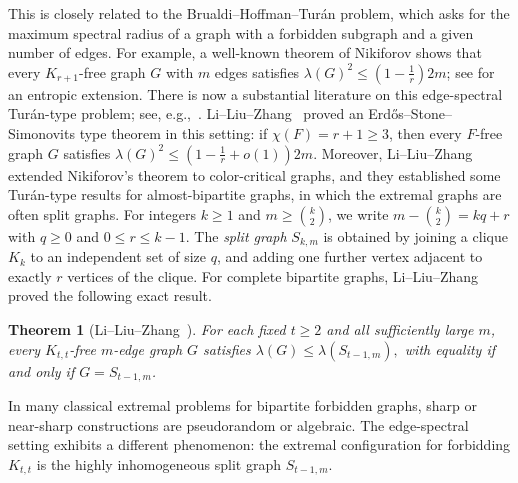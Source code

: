 \documentclass[11pt]{article}
\newtheorem{theorem}{Theorem}[section]
\theoremstyle{definition}
\theoremstyle{plain}
\begin{document}
This is closely related to the Brualdi--Hoffman--Tur\'an problem, which
asks for the maximum spectral radius of a graph with a forbidden subgraph
and a given number of edges. 
For example, a well-known theorem of Nikiforov \cite{Niki2002} shows that every $K_{r+1}$-free graph $G$ with $m$ edges satisfies $\lambda(G)^2 \le (1-\frac{1}{r})2m$; see \cite{ChaoYu2026JLMS} for an entropic extension.   
There is now a substantial literature on
this edge-spectral Tur\'{a}n-type problem; see, e.g.,~\cite{ZLS2021,LZS2024,LLLY2025,LLZ2025,LiLiuZhang2025NosalBooksC4,ZhaiLiLou2026,LZZ2024}. 
Li--Liu--Zhang~\cite{LiLiuZhang2025EdgeSpectralESS}
proved an Erd\H{o}s--Stone--Simonovits type theorem in this setting:
if \(\chi(F)=r+1\ge3\), then every \(F\)-free graph \(G\) satisfies $\lambda(G)^2\le \left(1-\frac1r+o(1)\right)2m$. 
Moreover, Li--Liu--Zhang \cite{LiLiuZhang2025ColorCritical} extended Nikiforov's theorem to color-critical graphs, and they established some Tur\'{a}n-type results for almost-bipartite graphs, in which the extremal graphs are often split graphs. For integers \(k\ge1\) and \(m\ge\binom{k}{2}\), 
we write
$m-\binom{k}{2}=kq+r$ with $q\ge 0$ and $0\le r\le k-1.$ 
The {\it split graph} \(S_{k,m}\) is obtained by joining a clique \(K_k\) to an
independent set of size \(q\), and adding one further vertex adjacent to
exactly \(r\) vertices of the clique.  For complete bipartite graphs,
Li--Liu--Zhang~\cite{LiLiuZhang2025ColorCritical} proved the following
exact result.

\begin{theorem}[Li--Liu--Zhang~\cite{LiLiuZhang2025ColorCritical}]
\label{thm-Ktt-free}
For each fixed \(t\ge2\) and all sufficiently large \(m\), every
\(K_{t,t}\)-free \(m\)-edge graph \(G\) satisfies
       $ \lambda(G)\le \lambda(S_{t-1,m}),$
with equality if and only if \(G=S_{t-1,m}\).
\end{theorem}

In many classical extremal problems for bipartite forbidden graphs,
sharp or near-sharp constructions are pseudorandom or algebraic.  The
edge-spectral setting exhibits a different phenomenon: the extremal
configuration for forbidding \(K_{t,t}\) is the highly inhomogeneous
split graph \(S_{t-1,m}\).
\end{document}
